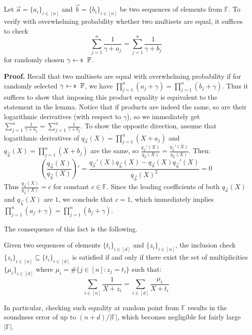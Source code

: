 \begin{lemma}
    Let $\vec{a} = \{a_i\}_{i \in [n]}$ and $\vec{b} = \{b_i\}_{i \in [n]}$ be
    two sequences of elements from $\mathbb{F}$. To verify with overwhelming
    probability whether two multisets are equal, it suffices to check
    \begin{equation*}
        \sum_{j=1}^n \frac{1}{\gamma + a_j} = \sum_{j=1}^n \frac{1}{\gamma+b_j}
    \end{equation*}
    for randomly chosen $\gamma \leftarrowS \mathbb{F}$.
\end{lemma}

\textbf{Proof.} Recall that two multisets are equal with overwhelming
probability if for randomly selected $\gamma \leftarrowS \mathbb{F}$, we have
$\prod_{j=1}^n (a_j+\gamma) = \prod_{j=1}^n (b_j+\gamma)$. Thus it suffices to
show that imposing this product equality is equivalent to the statement in the
lemma. Notice that if products are indeed the same, so are their logarithmic
derivatives (with respect to $\gamma$), so we immediately get $\sum_{j=1}^n
\frac{1}{\gamma + a_j} = \sum_{j=1}^n \frac{1}{\gamma+b_j}$. To show the
opposite direction, assume that logarithmic derivatives of $q_{\vec{a}}(X) =
\prod_{j=1}^n (X+a_j)$ and $q_{\vec{b}}(X) = \prod_{j=1}^n (X+b_j)$ are the same,
so $\frac{q_{\vec{a}}'(X)}{q_{\vec{a}}(X)} = \frac{q_{\vec{b}}'(X)}{q_{\vec{b}}(X)}$. Then:
\begin{equation*}
    \left(\frac{q_{\vec{a}}(X)}{q_{\vec{b}}(X)}\right)' = \frac{q_{\vec{a}}'(X)q_{\vec{b}}(X)-q_{\vec{a}}(X)q_{\vec{b}}'(X)}{q_{\vec{b}}(X)^2}=0
\end{equation*}
Thus $\frac{q_{\vec{a}}(X)}{q_{\vec{b}}(X)}=c$ for constant $c \in \mathbb{F}$.
Since the leading coefficients of both $q_{\vec{a}}(X)$ and $q_{\vec{b}}(X)$ are
$1$, we conclude that $c=1$, which immediately implies $\prod_{j=1}^n
(a_j+\gamma) = \prod_{j=1}^n (b_j+\gamma)$.

The consequence of this fact is the following.

\begin{lemma}
    Given two sequences of elements $\{t_i\}_{i \in [d]}$ and $\{z_i\}_{i \in
    [n]}$, the inclusion check $\{z_i\}_{i \in [n]} \subseteq \{t_i\}_{i \in
    [d]}$ is satisfied if and only if there exist the set of multiplicities
    $\{\mu_i\}_{i \in [d]}$ where $\mu_i = \#\{j \in [n]: z_j = t_i\}$ such that:
    \begin{equation*}
        \sum_{i \in [n]} \frac{1}{X+z_i} = \sum_{i \in [d]} \frac{\mu_i}{X+t_i}
    \end{equation*}

    In particular, checking such equality at random point from $\mathbb{F}$
    results in the soundness error of up to $(n+d)/|\mathbb{F}|$, which becomes
    negligible for fairly large $|\mathbb{F}|$.
\end{lemma}

